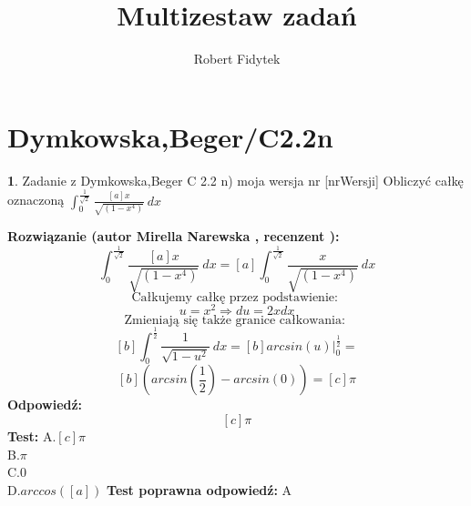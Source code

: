 \documentclass[12pt, a4paper]{article}
\title{Multizestaw zadań}
\author{Robert Fidytek}
\date{}
\theoremstyle{definition} %
\newtheorem{zad}{}
\newcommand{\kategoria}[1]{\section{#1}} %
\newcommand{\zadStart}[1]{\begin{zad}#1\newline} %
\newcommand{\zadStop}{\end{zad}}   %
\newcommand{\rozwStart}[2]{\noindent \textbf{Rozwiązanie (autor #1 , recenzent #2): }\newline} %
\newcommand{\odpStart}{\noindent \textbf{Odpowiedź:}\newline}    %
\newcommand{\odpStop}{\newline}                                             %
\newcommand{\testStart}{\noindent \textbf{Test:}\newline} %
\newcommand{\testStop}{\newline} %
\newcommand{\kluczStart}{\noindent \textbf{Test poprawna odpowiedź:}\newline} %
\newcommand{\kluczStop}{\newline} %
\begin{document}
\maketitle



\kategoria{Dymkowska,Beger/C2.2n}
\zadStart{Zadanie z Dymkowska,Beger C 2.2 n) moja wersja nr [nrWersji]}
Obliczyć całkę oznaczoną $\displaystyle \int_{0}^{\frac{1}{\sqrt{2}}} \frac{[a]x}{\sqrt{(1-x^4)}} \ dx $
\zadStop
\rozwStart{Mirella Narewska}{}
$$\int_{0}^{\frac{1}{\sqrt{2}}} \frac{[a]x}{\sqrt{(1-x^4)}} \ dx = [a]\int_{0}^{\frac{1}{\sqrt{2}}} \frac{x}{\sqrt{(1-x^4)}} \ dx$$
$$\text{Całkujemy  całkę przez podstawienie: }$$
$$u=x^2 \Rightarrow du=2x dx $$
$$\text{Zmieniają się także granice całkowania: }$$
$$[b] \int_{0}^{\frac{1}{2}}  \frac{1}{\sqrt{1-u^2}} \ dx=[b]arcsin(u)|_{0}^{\frac{1}{2}}=$$
$$[b]\left(arcsin(\frac{1}{2})-arcsin(0)\right)=[c]\pi$$
\odpStart
$$[c]\pi$$
\odpStop
\testStart
A.$[c]\pi$
\\
B.$\pi$
\\
C.$0$
\\
D.$arccos([a])$
\testStop
\kluczStart
A
\kluczStop
\end{document}
